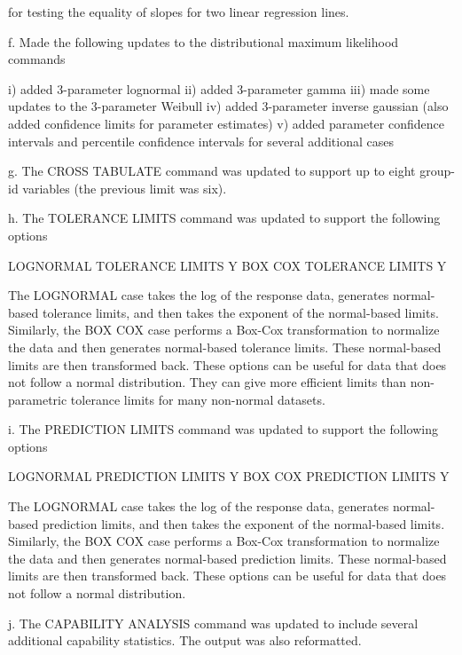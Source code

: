        for testing the equality of slopes for two linear regression lines.

    f. Made the following updates to the distributional maximum
       likelihood commands

          i) added 3-parameter lognormal
         ii) added 3-parameter gamma
        iii) made some updates to the 3-parameter Weibull
         iv) added 3-parameter inverse gaussian (also added confidence
             limits for parameter estimates)
          v) added parameter confidence intervals and percentile
             confidence intervals for several additional cases

    g. The CROSS TABULATE command was updated to support up to eight
       group-id variables (the previous limit was six).

    h. The TOLERANCE LIMITS command was updated to support the following
       options

          LOGNORMAL TOLERANCE LIMITS Y
          BOX COX TOLERANCE LIMITS Y

       The LOGNORMAL case takes the log of the response data, generates
       normal-based tolerance limits, and then takes the exponent of the
       normal-based limits.  Similarly, the BOX COX case performs a
       Box-Cox transformation to normalize the data and then generates
       normal-based tolerance limits.  These normal-based limits are
       then transformed back.  These options can be useful for data that
       does not follow a normal distribution. They can give more
       efficient limits than non-parametric tolerance limits for many
       non-normal datasets.

    i. The PREDICTION LIMITS command was updated to support the
       following options

          LOGNORMAL PREDICTION LIMITS Y
          BOX COX PREDICTION LIMITS Y

       The LOGNORMAL case takes the log of the response data, generates
       normal-based prediction limits, and then takes the exponent of the
       normal-based limits.  Similarly, the BOX COX case performs a
       Box-Cox transformation to normalize the data and then generates
       normal-based prediction limits.  These normal-based limits are
       then transformed back.  These options can be useful for data that
       does not follow a normal distribution.

    j. The CAPABILITY ANALYSIS command was updated to include several
       additional capability statistics.  The output was also reformatted.


